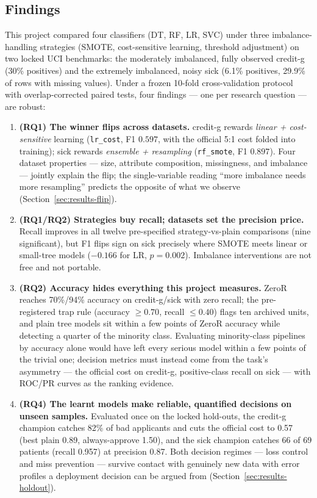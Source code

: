 \subsection{Findings}

This project compared four classifiers (DT, RF, LR, SVC) under three imbalance-handling strategies (SMOTE, cost-sensitive learning, threshold adjustment) on two locked UCI benchmarks: the moderately imbalanced, fully observed credit-g (30\% positives) and the extremely imbalanced, noisy sick (6.1\% positives, 29.9\% of rows with missing values). Under a frozen 10-fold cross-validation protocol with overlap-corrected paired tests, four findings --- one per research question --- are robust:

\begin{enumerate}
  \item \textbf{(RQ1) The winner flips across datasets.} credit-g rewards \emph{linear + cost-sensitive} learning (\texttt{lr\_cost}, F1 $0.597$, with the official 5:1 cost folded into training); sick rewards \emph{ensemble + resampling} (\texttt{rf\_smote}, F1 $0.897$). Four dataset properties --- size, attribute composition, missingness, and imbalance --- jointly explain the flip; the single-variable reading ``more imbalance needs more resampling'' predicts the opposite of what we observe (Section~\ref{sec:results-flip}).
  \item \textbf{(RQ1/RQ2) Strategies buy recall; datasets set the precision price.} Recall improves in all twelve pre-specified strategy-vs-plain comparisons (nine significant), but F1 flips sign on sick precisely where SMOTE meets linear or small-tree models ($-0.166$ for LR, $p=0.002$). Imbalance interventions are not free and not portable.
  \item \textbf{(RQ2) Accuracy hides everything this project measures.} ZeroR reaches 70\%/94\% accuracy on credit-g/sick with zero recall; the pre-registered trap rule (accuracy $\geq 0.70$, recall $\leq 0.40$) flags ten archived units, and plain tree models sit within a few points of ZeroR accuracy while detecting a quarter of the minority class. Evaluating minority-class pipelines by accuracy alone would have left every serious model within a few points of the trivial one; decision metrics must instead come from the task's asymmetry --- the official cost on credit-g, positive-class recall on sick --- with ROC/PR curves as the ranking evidence.
  \item \textbf{(RQ4) The learnt models make reliable, quantified decisions on unseen samples.} Evaluated once on the locked hold-outs, the credit-g champion catches 82\% of bad applicants and cuts the official cost to 0.57 (best plain 0.89, always-approve 1.50), and the sick champion catches 66 of 69 patients (recall 0.957) at precision 0.87. Both decision regimes --- loss control and miss prevention --- survive contact with genuinely new data with error profiles a deployment decision can be argued from (Section~\ref{sec:results-holdout}).
\end{enumerate}

